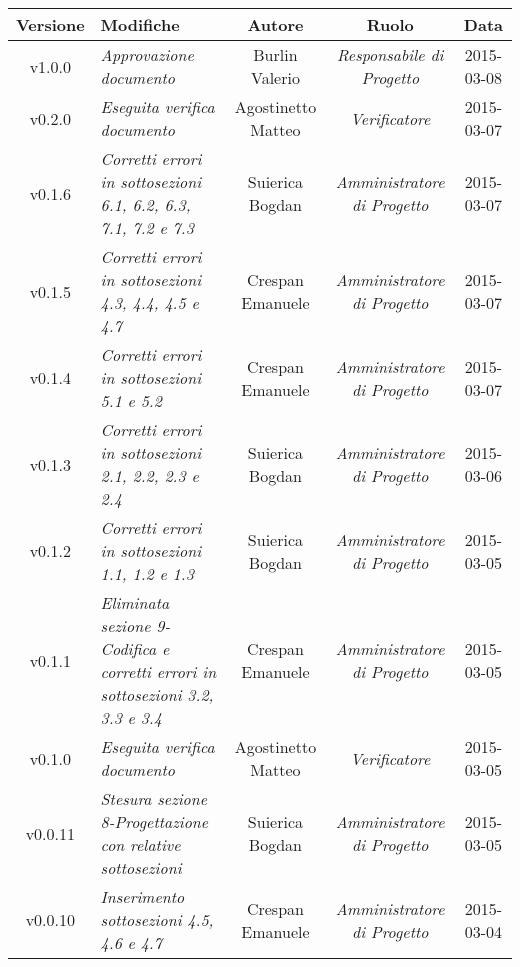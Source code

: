 \begin{table}[h]
\centering
\begin{tabular}{|c|p{}|c|c|c|}
	\toprule
		\textbf{Versione} & \textbf{Modifiche} & \textbf{Autore} & \textbf{Ruolo} & \textbf{Data} \\
	\midrule
	\midrule
		v1.0.0 & \textit{Approvazione documento} & Burlin Valerio & \textit{Responsabile di Progetto} & 2015-03-08\\
	\midrule
		v0.2.0 & \textit{Eseguita verifica documento} & Agostinetto Matteo & \textit{Verificatore} & 2015-03-07\\
	\midrule
		v0.1.6 & \textit{Corretti errori in sottosezioni 6.1, 6.2, 6.3, 7.1, 7.2 e 7.3} & Suierica Bogdan & \textit{Amministratore di Progetto} & 2015-03-07\\
	\midrule
		v0.1.5 & \textit{Corretti errori in sottosezioni 4.3, 4.4, 4.5 e 4.7} & Crespan Emanuele & \textit{Amministratore di Progetto} & 2015-03-07\\
	\midrule
		v0.1.4 & \textit{Corretti errori in sottosezioni 5.1 e 5.2} & Crespan Emanuele & \textit{Amministratore di Progetto} & 2015-03-07\\
	\midrule
		v0.1.3 & \textit{Corretti errori in sottosezioni 2.1, 2.2, 2.3 e 2.4} & Suierica Bogdan & \textit{Amministratore di Progetto} & 2015-03-06\\
	\midrule
		v0.1.2 & \textit{Corretti errori in sottosezioni 1.1, 1.2 e 1.3} & Suierica Bogdan & \textit{Amministratore di Progetto} & 2015-03-05\\
	\midrule
		v0.1.1 & \textit{Eliminata sezione 9-Codifica e corretti errori in sottosezioni 3.2, 3.3 e 3.4} & Crespan Emanuele & \textit{Amministratore di Progetto} & 2015-03-05\\
	\midrule
		v0.1.0 & \textit{Eseguita verifica documento} & Agostinetto Matteo & \textit{Verificatore} & 2015-03-05\\
	\midrule
		v0.0.11 & \textit{Stesura sezione 8-Progettazione con relative sottosezioni} & Suierica Bogdan & \textit{Amministratore di Progetto} & 2015-03-05\\
	\midrule
		v0.0.10 & \textit{Inserimento sottosezioni 4.5, 4.6 e 4.7} & Crespan Emanuele & \textit{Amministratore di Progetto} & 2015-03-04\\
	\bottomrule
\end{tabular}
\end{table}

\newpage

